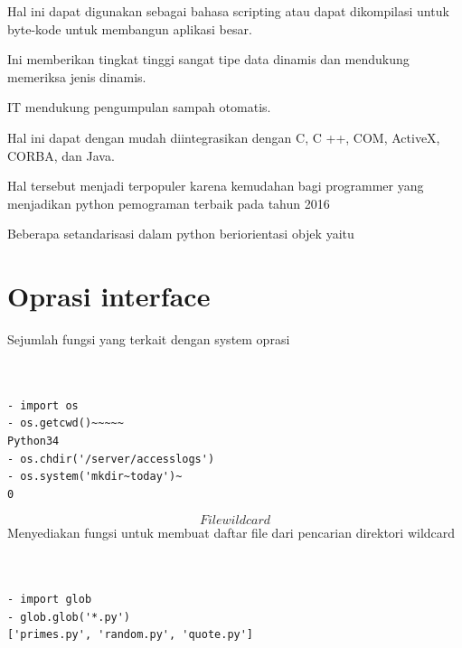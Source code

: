 {{{{{{{{{{{\vspace{\baselineskip}
\noindent 
Hal ini dapat digunakan sebagai bahasa scripting atau dapat dikompilasi untuk byte-kode untuk membangun aplikasi besar. \par
\vspace{\baselineskip}
\noindent 
Ini memberikan tingkat tinggi sangat tipe data dinamis dan mendukung memeriksa jenis dinamis. \par
\vspace{\baselineskip}
\noindent 
IT mendukung pengumpulan sampah otomatis. \par
\vspace{\baselineskip}
\noindent 
Hal ini dapat dengan mudah diintegrasikan dengan C, C ++, COM, ActiveX, CORBA, dan Java. \par
\vspace{\baselineskip}
\noindent 
Hal tersebut menjadi terpopuler karena kemudahan bagi programmer yang menjadikan python pemograman terbaik pada tahun 2016  \par
\vspace{\baselineskip}
\noindent 
Beberapa setandarisasi dalam python beriorientasi objek yaitu \par
\vspace{\baselineskip}
\noindent 
{\fontsize{14pt}{14pt}\section
{Oprasi interface}
\vspace{\baselineskip}
\noindent 
Sejumlah fungsi yang terkait dengan system oprasi \par
\vspace{\baselineskip}

\begin{verbatim}
	

- import os
- os.getcwd()~~~~~  
Python34
- os.chdir('/server/accesslogs')
- os.system('mkdir~today')~
0 
\end{verbatim} 
\begin{equation}
File wildcard 
\end{equation}
\vspace{\baselineskip}
\noindent 
Menyediakan fungsi untuk membuat daftar file dari pencarian direktori wildcard \par
\vspace{\baselineskip}

\begin{verbatim}
	

- import glob
- glob.glob('*.py')
['primes.py', 'random.py', 'quote.py'] 
\end{verbatim}

}}}}}}}}}}}}
